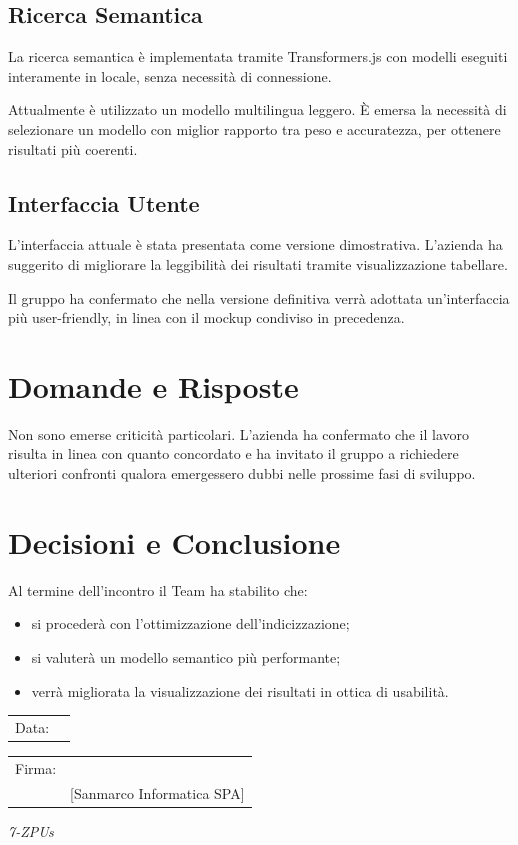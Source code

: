 \documentclass[a4paper,12pt]{article}
\begin{document}
\subsection{Ricerca Semantica}

La ricerca semantica è implementata tramite Transformers.js con modelli eseguiti interamente in locale, senza necessità di connessione.

Attualmente è utilizzato un modello multilingua leggero.  
È emersa la necessità di selezionare un modello con miglior rapporto tra peso e accuratezza, per ottenere risultati più coerenti.

\subsection{Interfaccia Utente}

L’interfaccia attuale è stata presentata come versione dimostrativa.  
L’azienda ha suggerito di migliorare la leggibilità dei risultati tramite visualizzazione tabellare.

Il gruppo ha confermato che nella versione definitiva verrà adottata un’interfaccia più user-friendly, in linea con il mockup condiviso in precedenza.

\section{Domande e Risposte}

Non sono emerse criticità particolari.  
L’azienda ha confermato che il lavoro risulta in linea con quanto concordato e ha invitato il gruppo a richiedere ulteriori confronti qualora emergessero dubbi nelle prossime fasi di sviluppo.


\section{Decisioni e Conclusione}

Al termine dell’incontro il Team ha stabilito che:
\begin{itemize}
    \item si procederà con l’ottimizzazione dell’indicizzazione;
    \item si valuterà un modello semantico più performante;
    \item verrà migliorata la visualizzazione dei risultati in ottica di usabilità.
\end{itemize}

\vfill

\begin{flushleft}
\begin{tabular}{@{}p{0.5in}p{2in}@{}}
Data: & \hrulefill \\
\end{tabular}

\vspace{1em}

\begin{tabular}{@{}p{0.5in}p{2in}@{}}
Firma: & \hrulefill \\
& [Sanmarco Informatica SPA] \\
\end{tabular}
\end{flushleft}

\begin{flushright}
\textit{7-ZPUs}
\end{flushright}
\end{document}
